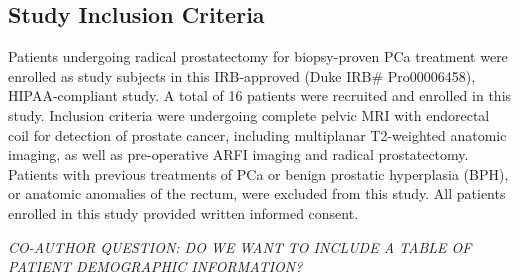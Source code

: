 \subsection{Study Inclusion Criteria}
Patients undergoing radical prostatectomy for biopsy-proven PCa treatment were
enrolled as study subjects in this IRB-approved (Duke IRB\# Pro00006458),
HIPAA-compliant study.  A total of 16 patients were recruited and enrolled in
this study.  Inclusion criteria were undergoing complete pelvic MRI with
endorectal coil for detection of prostate cancer, including multiplanar
T2-weighted anatomic imaging, as well as pre-operative ARFI imaging and radical
prostatectomy.  Patients with previous treatments of PCa or benign prostatic
hyperplasia (BPH), or anatomic anomalies of the rectum, were excluded from this
study.  All patients enrolled in this study provided written informed consent.

\emph{CO-AUTHOR QUESTION: DO WE WANT TO INCLUDE A TABLE OF PATIENT DEMOGRAPHIC INFORMATION?}
